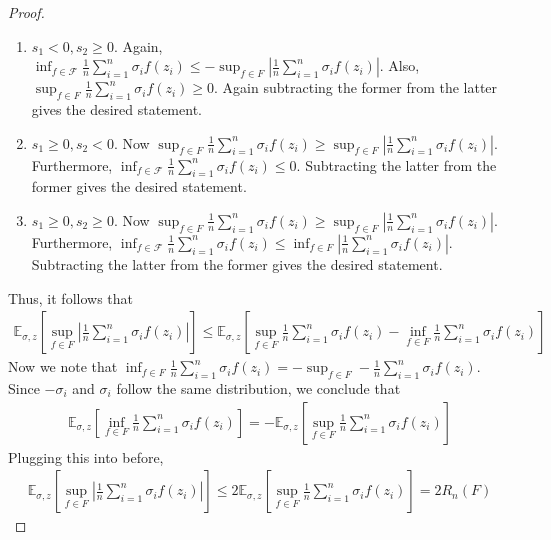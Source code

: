 \documentclass[11pt]{article}
\newcommand{\exu}[2]{\mathbb{E}_{#1}\left[{#2}\right]}
\begin{document}
\begin{proof}
\begin{enumerate}
		\item $s_1 < 0, s_2 \ge 0$. Again, $\inf_{f \in \mathcal{F}} \frac{1}{n} \sum_{i = 1}^n \sigma_i f(z_i) \le -\sup_{f\in F}\left| \frac{1}{n}\sum_{i=1}^n\sigma_if(z_i)\right|$. Also, $ \sup_{f\in F} \frac{1}{n}\sum_{i=1}^n\sigma_if(z_i) \ge 0$. Again subtracting the former from the latter gives the desired statement.
		\item $s_1 \ge 0, s_2 < 0$. Now $\sup_{f\in F} \frac{1}{n}\sum_{i=1}^n\sigma_if(z_i) \ge \sup_{f\in F}\left| \frac{1}{n}\sum_{i=1}^n\sigma_if(z_i)\right|$. Furthermore, $\inf_{f \in \mathcal{F}} \frac{1}{n} \sum_{i = 1}^n \sigma_i f(z_i) \le 0$. Subtracting the latter from the former gives the desired statement. 
		\item $s_1 \ge 0, s_2 \ge 0$. Now $\sup_{f\in F} \frac{1}{n}\sum_{i=1}^n\sigma_if(z_i) \ge \sup_{f\in F}\left| \frac{1}{n}\sum_{i=1}^n\sigma_if(z_i)\right|$. Furthermore, $\inf_{f \in \mathcal{F}} \frac{1}{n} \sum_{i = 1}^n \sigma_i f(z_i) \le \inf_{f\in F}\left| \frac{1}{n}\sum_{i=1}^n\sigma_if(z_i)\right|$. Subtracting the latter from the former gives the desired statement.
	\end{enumerate}
	Thus, it follows that 
	\begin{align*}
		\exu{\sigma,z}{\sup_{f\in F}\left| \frac{1}{n}\sum_{i=1}^n\sigma_if(z_i)\right|} \le \exu{\sigma, z}{\sup_{f\in F} \frac{1}{n}\sum_{i=1}^n\sigma_if(z_i) - \inf_{f\in F}\frac{1}{n}\sum_{i=1}^n\sigma_if(z_i)}
	\end{align*}
	Now we note that $\inf_{f\in F}\frac{1}{n}\sum_{i=1}^n\sigma_if(z_i) = -\sup_{f \in F}	-\frac{1}{n}\sum_{i=1}^n\sigma_if(z_i)$. Since $-\sigma_i$ and $\sigma_i$ follow the same distribution, we conclude that 
	\begin{align*}
	\exu{\sigma, z}{\inf_{f\in F}\frac{1}{n}\sum_{i=1}^n\sigma_if(z_i)} = -\exu{\sigma, z}{\sup_{f\in F}\frac{1}{n}\sum_{i=1}^n\sigma_if(z_i)}
	\end{align*}
	Plugging this into before, 
	\begin{align*}
	\exu{\sigma,z}{\sup_{f\in F}\left| \frac{1}{n}\sum_{i=1}^n\sigma_if(z_i)\right|} \le 2 \exu{\sigma, z}{\sup_{f\in F} \frac{1}{n}\sum_{i=1}^n\sigma_if(z_i)} = 2R_n(F)
	\end{align*}
\end{proof}
\end{document}
